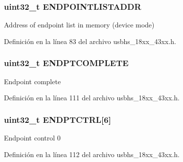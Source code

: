 \subsubsection[{\texorpdfstring{E\+N\+D\+P\+O\+I\+N\+T\+L\+I\+S\+T\+A\+D\+DR}{ENDPOINTLISTADDR}}]{ uint32\+\_\+t E\+N\+D\+P\+O\+I\+N\+T\+L\+I\+S\+T\+A\+D\+DR}\hypertarget{struct_l_p_c___u_s_b_h_s___t_a59d3d4b2c95485fdfd1aca397407cb9c}{}\label{struct_l_p_c___u_s_b_h_s___t_a59d3d4b2c95485fdfd1aca397407cb9c}
Address of endpoint list in memory (device mode) 

Definición en la línea 83 del archivo usbhs\+\_\+18xx\+\_\+43xx.\+h.

\subsubsection[{\texorpdfstring{E\+N\+D\+P\+T\+C\+O\+M\+P\+L\+E\+TE}{ENDPTCOMPLETE}}]{ uint32\+\_\+t E\+N\+D\+P\+T\+C\+O\+M\+P\+L\+E\+TE}\hypertarget{struct_l_p_c___u_s_b_h_s___t_aa9bc539392d3adc43d746fd2c3f96bd0}{}\label{struct_l_p_c___u_s_b_h_s___t_aa9bc539392d3adc43d746fd2c3f96bd0}
Endpoint complete 

Definición en la línea 111 del archivo usbhs\+\_\+18xx\+\_\+43xx.\+h.

\subsubsection[{\texorpdfstring{E\+N\+D\+P\+T\+C\+T\+RL}{ENDPTCTRL}}]{ uint32\+\_\+t E\+N\+D\+P\+T\+C\+T\+RL\mbox{[}6\mbox{]}}\hypertarget{struct_l_p_c___u_s_b_h_s___t_a6b661f29ba1596d4f44ce8491966c684}{}\label{struct_l_p_c___u_s_b_h_s___t_a6b661f29ba1596d4f44ce8491966c684}
Endpoint control 0 

Definición en la línea 112 del archivo usbhs\+\_\+18xx\+\_\+43xx.\+h.

